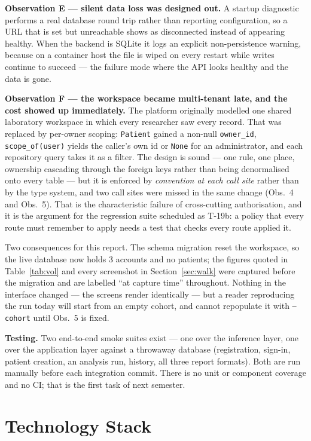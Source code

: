 \documentclass[11pt,a4paper]{article}
\newcommand{\code}[1]{\texttt{#1}}
\begin{document}
\textbf{Observation E --- silent data loss was designed out.} A startup
diagnostic performs a real database round trip rather than reporting
configuration, so a URL that is set but unreachable shows as disconnected
instead of appearing healthy. When the backend is SQLite it logs an explicit
non-persistence warning, because on a container host the file is wiped on every
restart while writes continue to succeed --- the failure mode where the API looks
healthy and the data is gone.

\textbf{Observation F --- the workspace became multi-tenant late, and the cost
showed up immediately.} The platform originally modelled one shared laboratory
workspace in which every researcher saw every record. That was replaced by
per-owner scoping: \code{Patient} gained a non-null \code{owner\_id},
\code{scope\_of(user)} yields the caller's own id or \code{None} for an
administrator, and each repository query takes it as a filter. The design is
sound --- one rule, one place, ownership cascading through the foreign keys
rather than being denormalised onto every table --- but it is enforced by
\emph{convention at each call site} rather than by the type system, and two call
sites were missed in the same change (Obs.~4 and Obs.~5). That is the
characteristic failure of cross-cutting authorisation, and it is the argument for
the regression suite scheduled as T-19b: a policy that every route must remember
to apply needs a test that checks every route applied it.

Two consequences for this report. The schema migration reset the workspace, so
the live database now holds 3 accounts and no patients; the figures quoted in
Table~\ref{tab:vol} and every screenshot in Section~\ref{sec:walk} were captured
before the migration and are labelled ``at capture time'' throughout. Nothing in
the interface changed --- the screens render identically --- but a reader
reproducing the run today will start from an empty cohort, and cannot repopulate
it with \code{--cohort} until Obs.~5 is fixed.

\textbf{Testing.} Two end-to-end smoke suites exist --- one over the inference
layer, one over the application layer against a throwaway database (registration,
sign-in, patient creation, an analysis run, history, all three report formats).
Both are run manually before each integration commit. There is no unit or
component coverage and no CI; that is the first task of next semester.

\section{Technology Stack}
\end{document}
